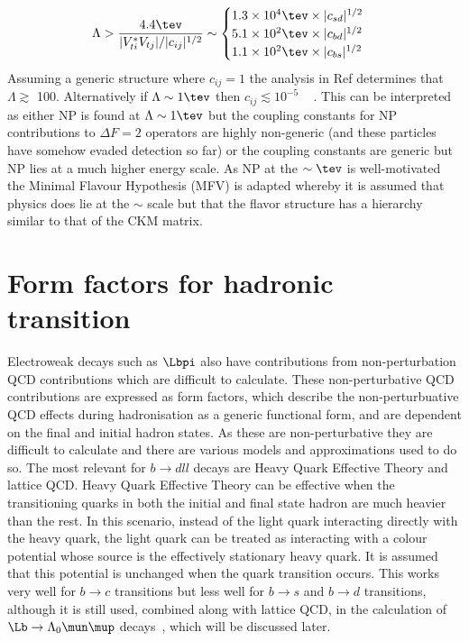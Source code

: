 \begin{equation}
  \Lambda>\frac{4.4\tev}{|V_{ti}^{*}V_{tj}|/|c_{ij}|^{1/2}} \sim
  \begin{cases}
    1.3\times 10^{4}\tev \times |c_{sd}|^{1/2}\\
    5.1\times 10^{2}\tev \times |c_{bd}|^{1/2}\\
    1.1\times 10^{2}\tev \times |c_{bs}|^{1/2}\\
  \end{cases}
\end{equation}
Assuming a generic structure where $c_{ij} = 1$ the analysis in Ref determines that $\Lambda \gtrsim$ 100\tev. Alternatively if $\Lambda \sim 1\tev$ then $c_{ij}\lesssim 10^{-5}$ ~\cite{flavourlimit} . This can be interpreted as either NP is found at $\Lambda \sim 1\tev$  but the coupling constants for NP contributions to $\Delta F=2$ operators are highly non-generic (and these particles have somehow evaded detection so far) or the coupling constants are generic but NP lies at a much higher energy scale. As NP at the $\sim \tev$ is well-motivated the Minimal Flavour Hypothesis (MFV) is adapted whereby it is assumed that physics does lie at the $\sim$ \tev scale but that the flavor structure has a hierarchy similar to that of the CKM matrix.
\section{Form factors for hadronic transition}
\label{subsec:ff}
Electroweak decays such as $\Lbpi$ also have contributions from non-perturbation QCD contributions which are difficult to calculate. These non-perturbative QCD contributions are expressed as form factors,  which describe the non-perturbuative QCD effects during hadronisation as a generic functional form, and are dependent on the final and initial hadron states. As these are non-perturbative they are difficult to calculate and there are various models and approximations used to do so. The most relevant for $b\to dll$ decays are Heavy Quark Effective Theory and lattice QCD. Heavy Quark Effective Theory can be effective when the transitioning quarks in both the initial and final state hadron are much heavier than the rest. In this scenario, instead of the light quark interacting directly with the heavy quark, the light quark can be treated as interacting with a colour potential whose source is the effectively stationary heavy quark. It is assumed that this potential is unchanged when the quark transition occurs. This works very well for $b\to c$ transitions but less well for $b\to s $ and $b\to d$ transitions, although it is still used, combined along with lattice QCD, in the calculation of $\Lb\to\Lambda_{0}\mun\mup$ decays~\cite{Meinel}, which will be discussed later.

